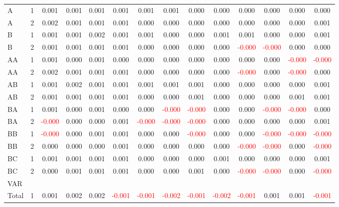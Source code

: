 \begin{table}[!htb]
{\begin{tabular}{llcccccccccccc}
A & 1 & 0.001 & 0.001 & 0.001 & 0.001 & 0.001 & 0.001 & 0.000 & 0.000 & 0.000 & 0.000 & 0.000 & 0.000\\
A & 2 & 0.002 & 0.001 & 0.001 & 0.001 & 0.000 & 0.000 & 0.000 & 0.000 & 0.000 & 0.000 & 0.000 & 0.001\\
B & 1 & 0.001 & 0.001 & 0.002 & 0.001 & 0.001 & 0.000 & 0.000 & 0.001 & 0.001 & 0.000 & 0.000 & 0.001\\
B & 2 & 0.001 & 0.001 & 0.001 & 0.001 & 0.000 & 0.000 & 0.000 & 0.000 & \textcolor{red}{-0.000} & \textcolor{red}{-0.000} & 0.000 & 0.000\\
AA & 1 & 0.001 & 0.000 & 0.001 & 0.000 & 0.000 & 0.000 & 0.000 & 0.000 & 0.000 & 0.000 & \textcolor{red}{-0.000} & \textcolor{red}{-0.000}\\
AA & 2 & 0.002 & 0.001 & 0.001 & 0.001 & 0.000 & 0.000 & 0.000 & 0.000 & \textcolor{red}{-0.000} & 0.000 & \textcolor{red}{-0.000} & 0.000\\
AB & 1 & 0.001 & 0.002 & 0.001 & 0.001 & 0.001 & 0.001 & 0.001 & 0.000 & 0.000 & 0.000 & 0.000 & 0.001\\
AB & 2 & 0.001 & 0.001 & 0.001 & 0.001 & 0.000 & 0.000 & 0.001 & 0.000 & 0.000 & 0.000 & 0.001 & 0.001\\
BA & 1 & 0.001 & 0.000 & 0.001 & 0.000 & 0.000 & \textcolor{red}{-0.000} & \textcolor{red}{-0.000} & 0.000 & 0.000 & \textcolor{red}{-0.000} & \textcolor{red}{-0.000} & 0.000\\
BA & 2 & \textcolor{red}{-0.000} & 0.000 & 0.000 & 0.001 & \textcolor{red}{-0.000} & \textcolor{red}{-0.000} & \textcolor{red}{-0.000} & 0.000 & 0.000 & 0.000 & 0.000 & 0.001\\
BB & 1 & \textcolor{red}{-0.000} & 0.000 & 0.001 & 0.001 & 0.000 & 0.000 & \textcolor{red}{-0.000} & 0.000 & 0.000 & \textcolor{red}{-0.000} & \textcolor{red}{-0.000} & \textcolor{red}{-0.000}\\
BB & 2 & 0.000 & 0.000 & 0.000 & 0.001 & 0.000 & 0.000 & 0.000 & 0.000 & \textcolor{red}{-0.000} & \textcolor{red}{-0.000} & 0.000 & \textcolor{red}{-0.000}\\
BC & 1 & 0.001 & 0.001 & 0.001 & 0.001 & 0.000 & 0.000 & 0.000 & 0.001 & 0.000 & 0.000 & 0.000 & 0.001\\
BC & 2 & 0.000 & 0.001 & 0.001 & 0.001 & 0.000 & 0.000 & 0.001 & 0.000 & \textcolor{red}{-0.000} & \textcolor{red}{-0.000} & 0.000 & \textcolor{red}{-0.000}\\
\hline
VAR &  &  &  &  &  &  &  &  &  &  &  &  & \\
\hline
Total & 1 & 0.001 & 0.002 & 0.002 & \textcolor{red}{-0.001} & \textcolor{red}{-0.001} & \textcolor{red}{-0.002} & \textcolor{red}{-0.001} & \textcolor{red}{-0.002} & \textcolor{red}{-0.001} & 0.001 & 0.001 & \textcolor{red}{-0.001}\\

\end{tabular}}
\end{table}
